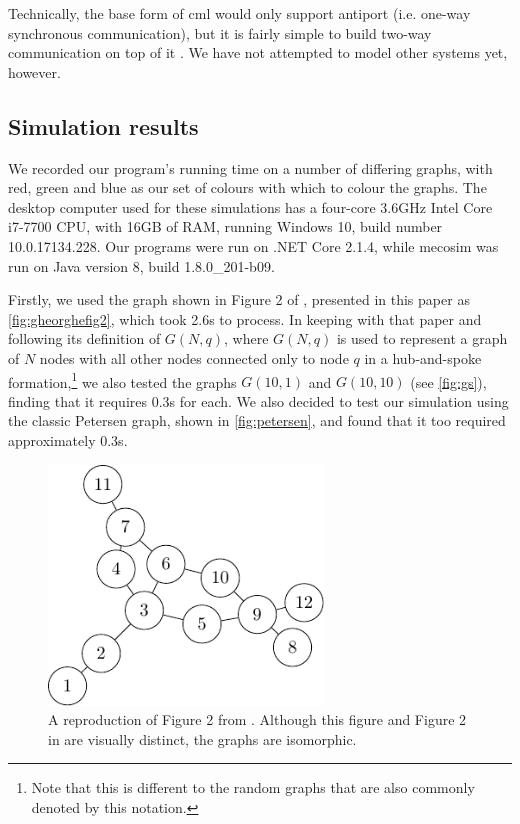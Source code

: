 Technically, the base form of \gls{cml} would only support antiport (i.e. one-way synchronous communication), but it is fairly simple to build two-way communication on top of it \cite[ch.~6]{Reppy2007}.  We have not attempted to model other systems yet, however.

\subsection{Simulation results}
We recorded our program's running time on a number of differing graphs, with red, green and blue as our set of colours with which to colour the graphs.  The desktop computer used for these simulations has a four-core 3.6GHz Intel Core i7-7700 CPU, with 16GB of RAM, running Windows 10, build number 10.0.17134.228.  Our \fsharp{} programs were run on .NET Core 2.1.4, while \gls{mecosim} was run on Java version 8, build 1.8.0\_201-b09.

Firstly, we used the graph shown in Figure 2 of \cite{Gheorghe2013}, presented in this paper as \autoref{fig:gheorghefig2}, which took 2.6s to process.  In keeping with that paper and following its definition of \(G(N,q)\), where \(G(N,q)\) is used to represent a graph of \(N\) nodes with all other nodes connected only to node \(q\) in a hub-and-spoke formation,\footnote{Note that this is different to the random graphs that are also commonly denoted by this notation.} we also tested the graphs \(G(10,1)\) and \(G(10,10)\) (see \autoref{fig:gs}), finding that it requires 0.3s for each.  We also decided to test our simulation using the classic Petersen graph, shown in \autoref{fig:petersen}, and found that it too required approximately 0.3s.

\begin{figure}
    \centering
    \includegraphics[width=0.65\textwidth]{chapters/gcol/figs/gheorghe-figure-2-figure0.pdf}
    \caption{\label{fig:gheorghefig2}A reproduction of Figure 2 from \cite{Gheorghe2013}.  Although this figure and Figure 2 in \cite{Gheorghe2013} are visually distinct, the graphs are isomorphic.}
\end{figure}

